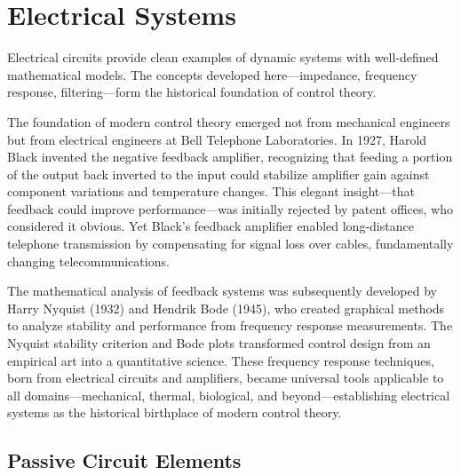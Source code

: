 
\chapter{Electrical Systems}
\label{ch:electrical}

Electrical circuits provide clean examples of dynamic systems with well-defined mathematical models. The concepts developed here---impedance, frequency response, filtering---form the historical foundation of control theory.
\begin{historicalbox}[title=Historical Context: Black's Negative Feedback Amplifier and Frequency Response Methods]
The foundation of modern control theory emerged not from mechanical engineers but from electrical engineers at Bell Telephone Laboratories. In 1927, Harold Black invented the negative feedback amplifier, recognizing that feeding a portion of the output back inverted to the input could stabilize amplifier gain against component variations and temperature changes. This elegant insight---that feedback could improve performance---was initially rejected by patent offices, who considered it obvious. Yet Black's feedback amplifier enabled long-distance telephone transmission by compensating for signal loss over cables, fundamentally changing telecommunications.

The mathematical analysis of feedback systems was subsequently developed by Harry Nyquist (1932) and Hendrik Bode (1945), who created graphical methods to analyze stability and performance from frequency response measurements. The Nyquist stability criterion and Bode plots transformed control design from an empirical art into a quantitative science. These frequency response techniques, born from electrical circuits and amplifiers, became universal tools applicable to all domains---mechanical, thermal, biological, and beyond---establishing electrical systems as the historical birthplace of modern control theory.
\end{historicalbox}

\section{Passive Circuit Elements}
\label{sec:passive_elements}

